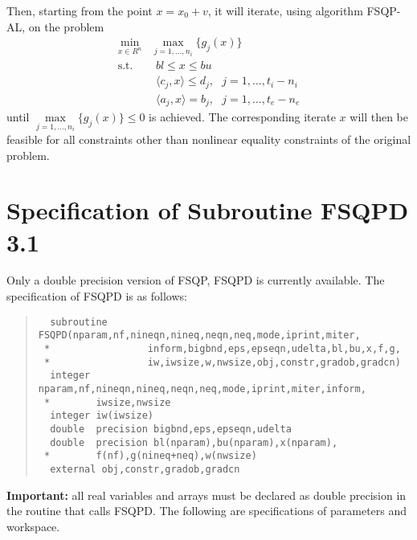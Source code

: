 \vspace{.5em}
\noindent{}Then, starting from the point $x=x_0+v$, it will iterate, 
using algorithm FSQP-AL, on the problem
\smallskip
$$\begin{array}{cl}
    \min\limits_{x\in R^n} &  \max\limits_{j=1,\ldots,n_i}\{g_j(x)\} \\
    \mbox{s.t.}  & ~~bl \leq x \leq bu\\
         & ~~\langle c_j,x\rangle \leq d_j,~~~j=1,\ldots,t_i-n_i\\
         & ~~\langle a_j,x \rangle =b_j,~~~j=1,\ldots , t_e-n_e 
            \end{array}$$
until $\max\limits_{j=1,\ldots,n_i}\{g_j(x)\} \leq 0$ is achieved.
The corresponding iterate $x$ will then be feasible 
for all constraints other than nonlinear equality constraints of 
the original problem. 

\section{Specification of Subroutine FSQPD 3.1}
Only a double precision version of FSQP, FSQPD is currently available.
The specification of FSQPD is as follows:
\vspace{1em}
\begin{quote}
\begin{verbatim}
  subroutine FSQPD(nparam,nf,nineqn,nineq,neqn,neq,mode,iprint,miter,
 *                 inform,bigbnd,eps,epseqn,udelta,bl,bu,x,f,g,
 *                 iw,iwsize,w,nwsize,obj,constr,gradob,gradcn)
  integer nparam,nf,nineqn,nineq,neqn,neq,mode,iprint,miter,inform,
 *        iwsize,nwsize
  integer iw(iwsize)
  double  precision bigbnd,eps,epseqn,udelta
  double  precision bl(nparam),bu(nparam),x(nparam),
 *        f(nf),g(nineq+neq),w(nwsize)
  external obj,constr,gradob,gradcn
\end{verbatim}
\end{quote}
\vspace{1em}
{\bf Important:} all real variables and arrays must be declared as 
double precision in the routine that calls FSQPD. The following are 
specifications of parameters and workspace.

